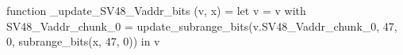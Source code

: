 function _update_SV48_Vaddr_bits (v, x) = let v = { v with SV48_Vaddr_chunk_0 = update_subrange_bits(v.SV48_Vaddr_chunk_0, 47, 0, subrange_bits(x, 47, 0)) } in
  v
